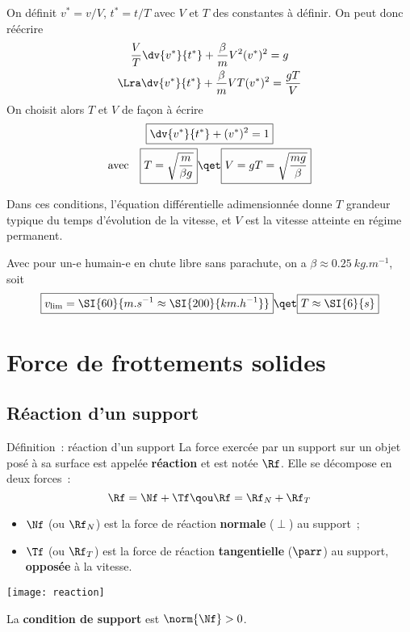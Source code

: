 \documentclass[../main/main.tex]{subfiles}
\begin{document}
On définit $v^* = v/V$, $t^* = t/T$ avec $V$ et $T$ des constantes à définir. On
peut donc réécrire
\begin{gather*}
    \frac{V}{T} \dv{v^*}{t^*} + \frac{\beta}{m}V^2(v^*)^2 = g
    \\\Lra
    \dv{v^*}{t^*} + \frac{\beta}{m}VT(v^*)^2 = \frac{gT}{V}
\end{gather*}
On choisit alors $T$ et $V$ de façon à écrire
\begin{gather*}
    \boxed{\dv{v^*}{t^*} + (v^*)^2 = 1}\\
    \text{avec}\quad
    \boxed{T = \sqrt{\frac{m}{\beta g}}}
    \qet
    \boxed{V = gT = \sqrt{\frac{mg}{\beta}}}
\end{gather*}

Dans ces conditions, l'équation différentielle adimensionnée donne $T$ grandeur
typique du temps d'évolution de la vitesse, et $V$ est la vitesse atteinte en
régime permanent.

Avec pour un-e humain-e en chute libre sans parachute, on a
$\beta \approx \SI{0.25}{kg.m^{-1}}$, soit
\[
    \boxed{v_{\lim} = \SI{60}{m.s^{-1} \approx \SI{200}{km.h^{-1}}}}
    \qet
    \boxed{T \approx \SI{6}{s}}
\]

\section{Force de frottements solides}
\subsection{Réaction d'un support}

\begin{tdefi}{Définition~: réaction d'un support}
    La force exercée par un support sur un objet posé à sa surface est appelée
    \textbf{réaction} et est notée $\Rf$. Elle se décompose en deux forces~:
    \[
        \Rf = \Nf + \Tf
        \qou
        \Rf = \Rf_N + \Rf_T
    \]
    \begin{itemize}
        \item $\Nf$ (ou $\Rf_N$) est la force de réaction \textbf{normale}
            ($\perp$) au support~;
        \item $\Tf$ (ou $\Rf_T$) est la force de réaction \textbf{tangentielle}
            ($\parr$) au support, \textbf{opposée} à la vitesse.
    \end{itemize}
    \begin{center}
        \texttt{[image: reaction]}
    \end{center}
    La \textbf{condition de support} est $\norm{\Nf} > 0$.
\end{tdefi}
\end{document}
